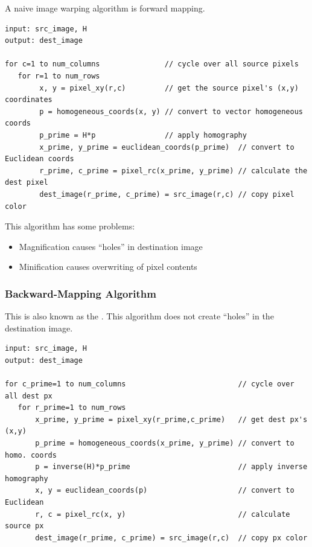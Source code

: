 \begin{example}
    A naive image warping algorithm is forward mapping. 

    \begin{verbatim}
input: src_image, H
output: dest_image

for c=1 to num_columns               // cycle over all source pixels
   for r=1 to num_rows
        x, y = pixel_xy(r,c)         // get the source pixel's (x,y) coordinates
        p = homogeneous_coords(x, y) // convert to vector homogeneous coords
        p_prime = H*p                // apply homography
        x_prime, y_prime = euclidean_coords(p_prime)  // convert to Euclidean coords
        r_prime, c_prime = pixel_rc(x_prime, y_prime) // calculate the dest pixel    
        dest_image(r_prime, c_prime) = src_image(r,c) // copy pixel color            
    \end{verbatim}

    This algorithm has some problems:

    \begin{itemize}
        \item Magnification causes ``holes'' in destination image
        \item Minification causes overwriting of pixel contents
    \end{itemize}
\end{example}

\subsubsection{Backward-Mapping Algorithm}

This is also known as the . This algorithm does not create ``holes'' in the destination image.

\begin{verbatim}
input: src_image, H
output: dest_image

for c_prime=1 to num_columns                          // cycle over all dest px
   for r_prime=1 to num_rows
       x_prime, y_prime = pixel_xy(r_prime,c_prime)   // get dest px's (x,y)
       p_prime = homogeneous_coords(x_prime, y_prime) // convert to homo. coords
       p = inverse(H)*p_prime                         // apply inverse homography
       x, y = euclidean_coords(p)                     // convert to Euclidean
       r, c = pixel_rc(x, y)                          // calculate source px
       dest_image(r_prime, c_prime) = src_image(r,c)  // copy px color
\end{verbatim}

